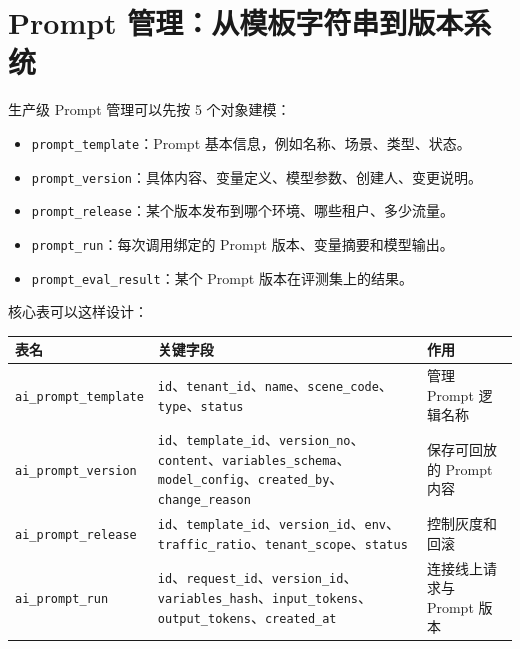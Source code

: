 \documentclass[9pt,a4paper,twocolumn]{ctexart}
\begin{document}
\section*{Prompt 管理：从模板字符串到版本系统}


生产级 Prompt 管理可以先按 5 个对象建模：


\begin{itemize}[itemsep=1pt, topsep=2pt]
  \item \texttt{prompt\_template}：Prompt 基本信息，例如名称、场景、类型、状态。
  \item \texttt{prompt\_version}：具体内容、变量定义、模型参数、创建人、变更说明。
  \item \texttt{prompt\_release}：某个版本发布到哪个环境、哪些租户、多少流量。
  \item \texttt{prompt\_run}：每次调用绑定的 Prompt 版本、变量摘要和模型输出。
  \item \texttt{prompt\_eval\_result}：某个 Prompt 版本在评测集上的结果。
\end{itemize}


核心表可以这样设计：


{\footnotesize
\begin{tabular}{|p{}|p{}|p{}|}
\hline
\textbf{表名} & \textbf{关键字段} & \textbf{作用} \\
\hline
\texttt{ai\_prompt\_template} & \texttt{id}、\texttt{tenant\_id}、\texttt{name}、\texttt{scene\_code}、\texttt{type}、\texttt{status} & 管理 Prompt 逻辑名称 \\
\hline
\texttt{ai\_prompt\_version} & \texttt{id}、\texttt{template\_id}、\texttt{version\_no}、\texttt{content}、\texttt{variables\_schema}、\texttt{model\_config}、\texttt{created\_by}、\texttt{change\_reason} & 保存可回放的 Prompt 内容 \\
\hline
\texttt{ai\_prompt\_release} & \texttt{id}、\texttt{template\_id}、\texttt{version\_id}、\texttt{env}、\texttt{traffic\_ratio}、\texttt{tenant\_scope}、\texttt{status} & 控制灰度和回滚 \\
\hline
\texttt{ai\_prompt\_run} & \texttt{id}、\texttt{request\_id}、\texttt{version\_id}、\texttt{variables\_hash}、\texttt{input\_tokens}、\texttt{output\_tokens}、\texttt{created\_at} & 连接线上请求与 Prompt 版本 \\
\hline
\end{tabular}
}
\end{document}
